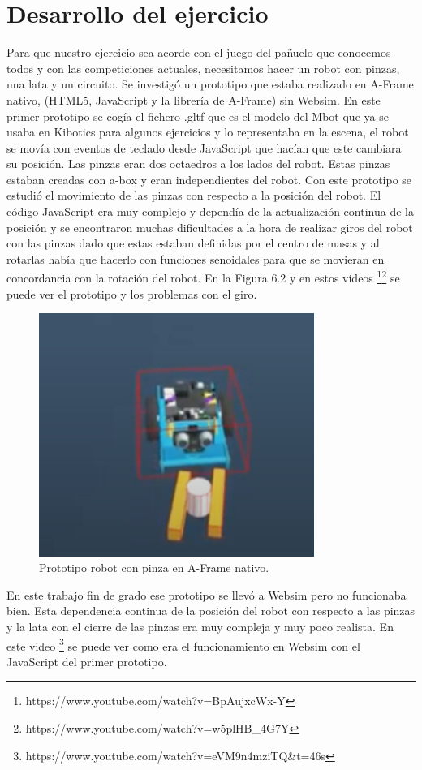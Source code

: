 \section{Desarrollo del ejercicio}

Para que nuestro ejercicio sea acorde con el juego del pañuelo que conocemos todos y con las competiciones actuales, necesitamos hacer un robot con pinzas, una lata  y un circuito.
Se investigó un prototipo que estaba realizado en A-Frame nativo, (HTML5, JavaScript y la librería de A-Frame) sin Websim.
En este primer prototipo se cogía el fichero .gltf  que es el modelo del Mbot que ya se usaba en Kibotics para algunos ejercicios y lo representaba en la escena, el robot se movía con eventos de teclado desde JavaScript que hacían que este cambiara su posición. Las pinzas eran dos octaedros a los lados del robot. Estas pinzas estaban creadas con a-box y eran  independientes del robot. Con este prototipo se estudió el movimiento de las pinzas con respecto a la posición del robot. El código JavaScript era muy complejo y dependía de la actualización continua de la posición y se encontraron muchas dificultades a la hora de realizar giros del robot con las pinzas dado que estas estaban definidas por el centro de masas y al rotarlas había que hacerlo con funciones senoidales para que se movieran en concordancia con la rotación del robot. En la Figura 6.2 y en estos vídeos \footnote{https://www.youtube.com/watch?v=BpAujxcWx-Y}\footnote{https://www.youtube.com/watch?v=w5plHB\_4G7Y} se puede ver el prototipo y los problemas con el giro.

 \begin{figure}[H]
  \centering
 \includegraphics[width=0.8\textwidth, height=0.5\textwidth]{chapters/images/prototipo.png}
  \caption{Prototipo robot con pinza en A-Frame nativo.}
\end{figure}

En este trabajo fin de grado ese prototipo se llevó a Websim pero no funcionaba bien. Esta dependencia continua de la posición del robot con respecto a las pinzas y la lata con el cierre de las pinzas era muy compleja y muy poco realista. En este video  \footnote{https://www.youtube.com/watch?v=eVM9n4mziTQ\&t=46s} se puede ver como era el funcionamiento en Websim con el JavaScript del primer prototipo.  


